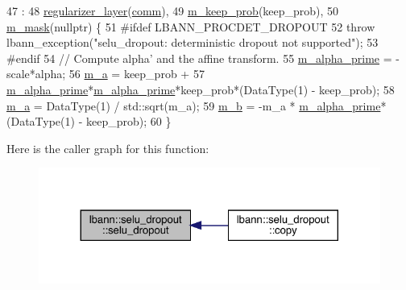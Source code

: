 \begin{DoxyCode}
47                                                                              :
48     \hyperlink{classlbann_1_1regularizer__layer_a2ebf3877b905b479a0250b74cf8f68b3}{regularizer\_layer}(\hyperlink{file__io_8cpp_ab048c6f9fcbcfaa57ce68b00263dbebe}{comm}),
49     \hyperlink{classlbann_1_1selu__dropout_a00bd2a07703e2e918af8ae68b58ff11b}{m\_keep\_prob}(keep\_prob),
50     \hyperlink{classlbann_1_1selu__dropout_a31aaadbc51d78673a84390b48d4e5950}{m\_mask}(\textcolor{keyword}{nullptr}) \{
51 \textcolor{preprocessor}{#ifdef LBANN\_PROCDET\_DROPOUT}
52     \textcolor{keywordflow}{throw} lbann\_exception(\textcolor{stringliteral}{"selu\_dropout: deterministic dropout not supported"});
53 \textcolor{preprocessor}{#endif}
54     \textcolor{comment}{// Compute alpha' and the affine transform.}
55     \hyperlink{classlbann_1_1selu__dropout_a8db065b13d8737e1bd4cf154ab3fe666}{m\_alpha\_prime} = -scale*alpha;
56     \hyperlink{classlbann_1_1selu__dropout_a52bd21583da68ba4e8a374fab259a3ef}{m\_a} = keep\_prob +
57       \hyperlink{classlbann_1_1selu__dropout_a8db065b13d8737e1bd4cf154ab3fe666}{m\_alpha\_prime}*\hyperlink{classlbann_1_1selu__dropout_a8db065b13d8737e1bd4cf154ab3fe666}{m\_alpha\_prime}*keep\_prob*(DataType(1) - keep\_prob);
58     \hyperlink{classlbann_1_1selu__dropout_a52bd21583da68ba4e8a374fab259a3ef}{m\_a} = DataType(1) / std::sqrt(m\_a);
59     \hyperlink{classlbann_1_1selu__dropout_a456fa501b7df6b52701c1aa3639ebc42}{m\_b} = -m\_a * \hyperlink{classlbann_1_1selu__dropout_a8db065b13d8737e1bd4cf154ab3fe666}{m\_alpha\_prime}*(DataType(1) - keep\_prob);
60   \}
\end{DoxyCode}
Here is the caller graph for this function\+:\nopagebreak
\begin{figure}[H]
\begin{center}
\leavevmode
\includegraphics[width=324pt]{classlbann_1_1selu__dropout_a988a7e6b7b85ef8ba08a2bc52537e6d3_icgraph}
\end{center}
\end{figure}
\mbox{\label{classlbann_1_1selu__dropout_ae8e81800cf4c75bcf449e192988832b5}} 
